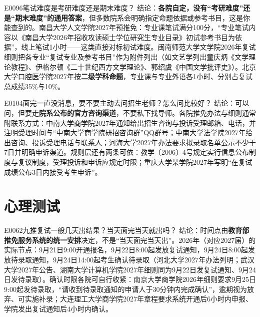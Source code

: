 \begin{qa}{E0096}{笔试难度是考研难度还是期末难度？}
结论：\textbf{各院自定，没有“考研难度”还是“期末难度”的通用答案}，但多数院系会明确指定命题依据或参考书目，这是你能查到的。南昌大学人文学院2027年预推免：专业课笔试满分100分，“专业笔试内容以《南昌大学2026年招收攻读硕士学位研究生专业目录》初试参考书目为依据”，线上笔试1小时——这类直接对标初试难度。闽南师范大学文学院2026年复试细则把各专业“复试专业及参考书目”作为附件列出（如文艺学列出童庆炳《文学理论教程》、伊格尔顿《二十世纪西方文学理论》、郭绍虞《中国文学批评史》）。北京大学口腔医学院2027年按\textbf{二级学科命题}，专业课与专业外语各1小时、分别占复试总成绩35\%与10\%。
\end{qa}

\begin{qa}{E0104}{面完一直没消息，要不要主动去问招生老师？怎么问比较好？}
结论：可以问，但要走\textbf{院系公布的官方咨询渠道}，不要私下找导师。各院推免办法与细则通常附联系方式：中南大学商学院2027年通知给出招生咨询与投诉受理邮箱、电话，并注明受理时间与“中南大学商学院研招咨询群”QQ群号；中南大学法学院2027年给出咨询、投诉受理电话与联系人；河海大学2027年办法要求拟录取名单公示不少于7日并明确申诉渠道。规则层还有两条可依：教学〔2006〕4号规定实行信息公布制度与复议制度，受理投诉和申诉应规定时限；重庆大学某学院2027年写明“在复试成绩公布3日内接受考生申诉”。
\end{qa}

\section{心理测试}
\begin{qa}{E0062}{九推复试一般几天出结果？当天面完当天就出吗？}
结论：时间点由\textbf{教育部推免服务系统的统一安排}决定，不是“当天面完当天出”。2026年（对应2027届）的实际节点：9月21日9:00开通报名，9月22日8:00起发放复试通知，9月24日8:00起发放待录取通知，9月24日14:00起考生确认待录取（河北大学2027年办法列明；武汉大学2027年公告、湖南大学计算机学院2027年细则同为9月22日发复试通知、9月24日发待录取）。确认时限各院可自行收紧：南京大学商学院2026年细则要求9月25日9:00起发待录取，“请收到待录取通知的申请人于30分钟内完成确认”，逾期视为放弃、可实施补录；大连理工大学商学院2027年章程要求系统开通后6小时内申报、学院发出复试通知后4小时内确认。
\end{qa}

